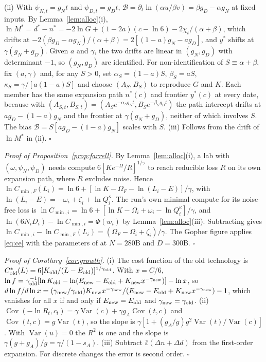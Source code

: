 \documentclass[AER,finalmode]{AEA}
\theoremstyle{definition}
\theoremstyle{remark}
\providecommand{\Var}{\operatorname{Var}}
\providecommand{\Cov}{\operatorname{Cov}}
\begin{document}
(ii) With $\psi_{N,t}=g_Nt$ and $\psi_{D,t}=g_Dt$, $\mathcal B=\partial_t\ln(\alpha u/\beta v)=\beta g_D-\alpha g_N$ at
fixed inputs. By Lemma~\ref{lem:alloc}(i), $\ln M^*=d^*-n^*=-2\ln G+(1-2a)(c-\ln6)-2\chi_t/(\alpha+\beta)$, which
drifts at $-2(\beta g_D-\alpha g_N)/(\alpha+\beta)=2[(1-a)g_N-ag_D]$, and $y^*$ shifts at $\gamma(g_N+g_D)$. Given $a$
and $\gamma$, the two drifts are linear in $(g_N,g_D)$ with determinant $-1$, so $(g_N,g_D)$ are identified. For
non-identification of $S\equiv\alpha+\beta$, fix $(a,\gamma)$ and, for any $S>0$, set $\alpha_S=(1-a)S$, $\beta_S=aS$,
$\kappa_S=\gamma/[a(1-a)S]$ and choose $(A_S,B_S)$ to reproduce $G$ and $K$. Each member has the same expansion path
$n^*(c)$ and frontier $y^*(c)$ at every date, because with $(A_{S,t},B_{S,t})=(A_Se^{-\alpha_Sg_Nt},B_Se^{-\beta_Sg_Dt})$
the path intercept drifts at $ag_D-(1-a)g_N$ and the frontier at $\gamma(g_N+g_D)$, neither of which involves $S$. The
bias $\mathcal B=S[ag_D-(1-a)g_N]$ scales with $S$. (iii) Follows from the drift of $\ln M^*$ in (ii). $\square$

\textit{Proof of Proposition~\ref{prop:farrell}.} By Lemma~\ref{lem:alloc}(i), a lab with $(\omega,\psi_N,\psi_D)$ needs
compute $6[Ke^{-\Omega}/R]^{1/\gamma}$ to reach reducible loss $R$ on its own expansion path, where $R$ excludes noise.
Hence $\ln C_{\min,F}(L_i)=\ln6+[\ln K-\Omega_F-\ln(L_i-E)]/\gamma$, with $\ln(L_i-E)=-\omega_i+\zeta_i+\ln Q_i^\kappa$.
The run's own minimal compute for its noise-free loss is $\ln C_{\min,i}=\ln6+[\ln K-\Omega_i+\omega_i-\ln
Q_i^\kappa]/\gamma$, and $\ln(6N_iD_i)-\ln C_{\min,i}=\Phi(w_i)$ by Lemma~\ref{lem:alloc}(iii). Subtracting gives
$\ln C_{\min,i}-\ln C_{\min,F}(L_i)=(\Omega_F-\Omega_i+\zeta_i)/\gamma$. The Gopher figure applies \eqref{eq:ce} with the
parameters of \citet{besiroglu2024chinchilla} at $N=280$B and $D=300$B. $\square$

\textit{Proof of Corollary~\ref{cor:growth}.} (i) The cost function of the old technology is
$C^*_{\rm old}(L)=6[K_{\rm old}/(L-E_{\rm old})]^{1/\gamma_{\rm old}}$. With $x=C/6$,
$\ln f=\gamma_{\rm old}^{-1}[\ln K_{\rm old}-\ln(E_{\rm new}-E_{\rm old}+K_{\rm new}x^{-\gamma_{\rm new}})]-\ln x$, so
$d\ln f/d\ln x=(\gamma_{\rm new}/\gamma_{\rm old})K_{\rm new}x^{-\gamma_{\rm new}}/(E_{\rm new}-E_{\rm
old}+K_{\rm new}x^{-\gamma_{\rm new}})-1$, which vanishes for all $x$ if and only if $E_{\rm new}=E_{\rm old}$ and
$\gamma_{\rm new}=\gamma_{\rm old}$. (ii) $\Cov(-\ln R_t,c_t)=\gamma\Var(c)+\gamma g_A\Cov(t,c)$ and
$\Cov(t,c)=g\Var(t)$, so the slope is $\gamma[1+(g_A/g)g^2\Var(t)/\Var(c)]$. With $\Var(u)=0$ the $R^2$ is one and the
slope is $\gamma(g+g_A)/g=\gamma/(1-s_A)$. (iii) Subtract $\bar\varepsilon(\Delta n+\Delta d)$ from the first-order
expansion. For discrete changes the error is second order. $\square$
\end{document}
